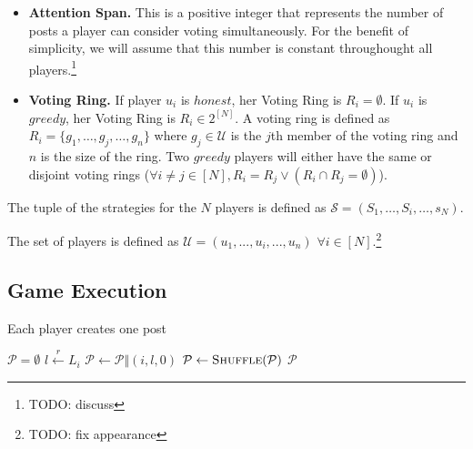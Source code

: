 \begin{itemize}
\begin{itemize}
          \item \textbf{Attention Span.} This is a positive integer that
          represents the number of posts a player can consider voting
          simultaneously. For the benefit of simplicity, we will assume that this
          number is constant throughought all players.\footnote{TODO: discuss}

          \item \textbf{Voting Ring.}  If player $u_i$ is $honest$, her Voting
          Ring is $R_i = \emptyset$. If $u_i$ is $greedy$, her Voting Ring is $R_i
          \in 2^{\left[N\right]}$. A voting ring is defined as $R_i = \lbrace
          g_1, \dots, g_j, \dots, g_n \rbrace$ where $g_j \in \mathcal{U}$ is the
          $j$th member of the voting ring and $n$ is the size of the ring. Two
          $greedy$ players will either have the same or disjoint voting rings
          ($\forall i \neq j \in \left[N\right], R_i = R_j \vee \left(R_i \cap
          R_j = \emptyset\right)$).
        \end{itemize}
        The tuple of the strategies for the $N$ players is defined as
        $\mathcal{S} = (S_1, \dots, S_i, \dots, s_N)$.
      \end{itemize}
      The set of players is defined as $\mathcal{U} = ( u_1,..., u_i,..., u_n )$
      $\forall i \in \left[N\right]$.\footnote{TODO: fix appearance}

  \subsection{Game Execution}
    \begin{algorithm}
      \caption{Each player creates one post}
      \label{alg:postGen}
      \begin{algorithmic}[1]
        \State $\mathcal{P} = \emptyset$ 
           \State $l \xleftarrow{r} L_i$
           \State $\mathcal{P} \leftarrow \mathcal{P} \Vert \left(i, l, 0\right)$
        \EndFor
        \State $\mathcal{P} \leftarrow \textsc{Shuffle}(\mathcal{P})$
        \State \Return $\mathcal{P}$
      \EndFunction
      \end{algorithmic}
    \end{algorithm}


